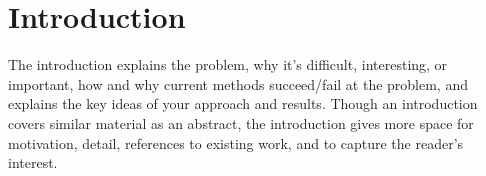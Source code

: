 \section{Introduction}
The introduction explains the problem, why it's difficult, interesting, or important, how and why current methods succeed/fail at the problem, and explains the key ideas of your approach and results. Though an introduction covers similar material as an abstract, the introduction gives more space for motivation, detail, references to existing work, and to capture the reader's interest.